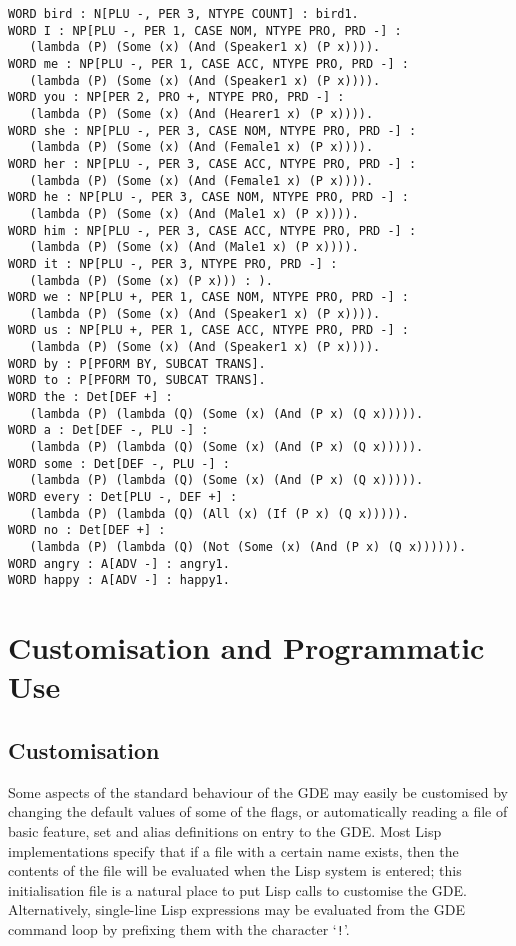 {\begin{verbatim}
WORD bird : N[PLU -, PER 3, NTYPE COUNT] : bird1.
WORD I : NP[PLU -, PER 1, CASE NOM, NTYPE PRO, PRD -] : 
   (lambda (P) (Some (x) (And (Speaker1 x) (P x)))).
WORD me : NP[PLU -, PER 1, CASE ACC, NTYPE PRO, PRD -] : 
   (lambda (P) (Some (x) (And (Speaker1 x) (P x)))).
WORD you : NP[PER 2, PRO +, NTYPE PRO, PRD -] : 
   (lambda (P) (Some (x) (And (Hearer1 x) (P x)))).
WORD she : NP[PLU -, PER 3, CASE NOM, NTYPE PRO, PRD -] : 
   (lambda (P) (Some (x) (And (Female1 x) (P x)))).
WORD her : NP[PLU -, PER 3, CASE ACC, NTYPE PRO, PRD -] : 
   (lambda (P) (Some (x) (And (Female1 x) (P x)))).
WORD he : NP[PLU -, PER 3, CASE NOM, NTYPE PRO, PRD -] : 
   (lambda (P) (Some (x) (And (Male1 x) (P x)))).
WORD him : NP[PLU -, PER 3, CASE ACC, NTYPE PRO, PRD -] : 
   (lambda (P) (Some (x) (And (Male1 x) (P x)))).
WORD it : NP[PLU -, PER 3, NTYPE PRO, PRD -] : 
   (lambda (P) (Some (x) (P x))) : ).
WORD we : NP[PLU +, PER 1, CASE NOM, NTYPE PRO, PRD -] : 
   (lambda (P) (Some (x) (And (Speaker1 x) (P x)))).
WORD us : NP[PLU +, PER 1, CASE ACC, NTYPE PRO, PRD -] : 
   (lambda (P) (Some (x) (And (Speaker1 x) (P x)))).
WORD by : P[PFORM BY, SUBCAT TRANS].
WORD to : P[PFORM TO, SUBCAT TRANS].
WORD the : Det[DEF +] : 
   (lambda (P) (lambda (Q) (Some (x) (And (P x) (Q x))))).
WORD a : Det[DEF -, PLU -] : 
   (lambda (P) (lambda (Q) (Some (x) (And (P x) (Q x))))).
WORD some : Det[DEF -, PLU -] : 
   (lambda (P) (lambda (Q) (Some (x) (And (P x) (Q x))))).
WORD every : Det[PLU -, DEF +] : 
   (lambda (P) (lambda (Q) (All (x) (If (P x) (Q x))))).
WORD no : Det[DEF +] : 
   (lambda (P) (lambda (Q) (Not (Some (x) (And (P x) (Q x)))))).
WORD angry : A[ADV -] : angry1.
WORD happy : A[ADV -] : happy1.
\end{verbatim}
}


\chapter{Customisation and Programmatic Use}

\section{Customisation}

Some aspects of the standard behaviour of the GDE may easily be customised
by changing the default values of some of the flags, or automatically
reading a file of basic feature, set and alias definitions on entry to
the GDE. Most Lisp implementations specify that if a file with a certain
name exists, then the contents of the file will be evaluated when the
Lisp system is entered; this initialisation file is a natural place to
put Lisp calls to customise the GDE. Alternatively, single-line Lisp
expressions may be evaluated from the GDE command loop
by prefixing them with the character `{\tt !}'.

